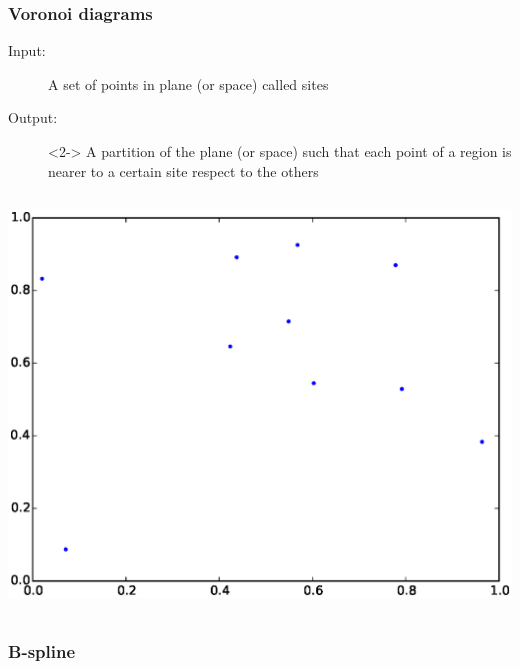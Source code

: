 \begin{frame}
  \frametitle{Voronoi diagrams}
  \begin{description}
  \item[Input:] A set of points in plane (or space) called
    \alert{sites}
  \item[Output:]<2-> A partition of the plane (or space) such that each
    point of a \alert{region} is nearer to a certain site respect to
    the others
  \end{description}
  \begin{columns}
    \begin{column}{0.5\textwidth}
      \begin{center}
        \includegraphics[width=\textwidth]{img/voroSites.eps}
      \end{center}
    \end{column}
  \end{columns}
\end{frame}

\begin{frame}
  \frametitle{B-spline}
\end{frame}

